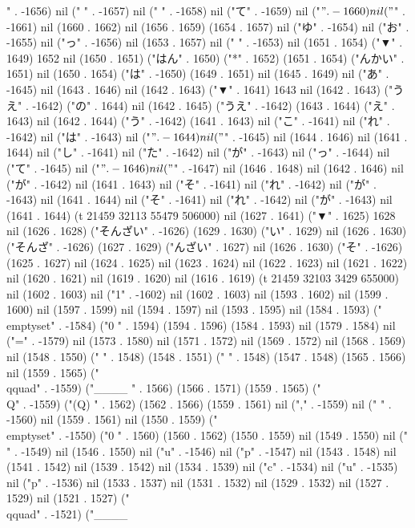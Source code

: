{" . -1656) nil (" " . -1657) nil (" " . -1658) nil ("て" . -1659) nil ("$" . -1660) nil ("$" . -1661) nil (1660 . 1662) nil (1656 . 1659) (1654 . 1657) nil ("ゆ" . -1654) nil ("お" . -1655) nil ("っ" . -1656) nil (1653 . 1657) nil (" " . -1653) nil (1651 . 1654) ("▼" . 1649) 1652 nil (1650 . 1651) ("はん" . 1650) ("*" . 1652) (1651 . 1654) ("んかい" . 1651) nil (1650 . 1654) ("は" . -1650) (1649 . 1651) nil (1645 . 1649) nil ("あ" . -1645) nil (1643 . 1646) nil (1642 . 1643) ("▼" . 1641) 1643 nil (1642 . 1643) ("うえ" . -1642) ("の" . 1644) nil (1642 . 1645) ("うえ" . -1642) (1643 . 1644) ("え" . 1643) nil (1642 . 1644) ("う" . -1642) (1641 . 1643) nil ("こ" . -1641) nil ("れ" . -1642) nil ("は" . -1643) nil ("$" . -1644) nil ("$" . -1645) nil (1644 . 1646) nil (1641 . 1644) nil ("し" . -1641) nil ("た" . -1642) nil ("が" . -1643) nil ("っ" . -1644) nil ("て" . -1645) nil ("$" . -1646) nil ("$" . -1647) nil (1646 . 1648) nil (1642 . 1646) nil ("が" . -1642) nil (1641 . 1643) nil ("そ" . -1641) nil ("れ" . -1642) nil ("が" . -1643) nil (1641 . 1644) nil ("そ" . -1641) nil ("れ" . -1642) nil ("が" . -1643) nil (1641 . 1644) (t 21459 32113 55479 506000) nil (1627 . 1641) ("▼" . 1625) 1628 nil (1626 . 1628) ("そんざい" . -1626) (1629 . 1630) ("い" . 1629) nil (1626 . 1630) ("そんざ" . -1626) (1627 . 1629) ("んざい" . 1627) nil (1626 . 1630) ("そ" . -1626) (1625 . 1627) nil (1624 . 1625) nil (1623 . 1624) nil (1622 . 1623) nil (1621 . 1622) nil (1620 . 1621) nil (1619 . 1620) nil (1616 . 1619) (t 21459 32103 3429 655000) nil (1602 . 1603) nil ("1" . -1602) nil (1602 . 1603) nil (1593 . 1602) nil (1599 . 1600) nil (1597 . 1599) nil (1594 . 1597) nil (1593 . 1595) nil (1584 . 1593) ("\\emptyset" . -1584) ("0
" . 1594) (1594 . 1596) (1584 . 1593) nil (1579 . 1584) nil ("=" . -1579) nil (1573 . 1580) nil (1571 . 1572) nil (1569 . 1572) nil (1568 . 1569) nil (1548 . 1550) ("   " . 1548) (1548 . 1551) (" " . 1548) (1547 . 1548) (1565 . 1566) nil (1559 . 1565) ("\\qquad" . -1559) ("____
" . 1566) (1566 . 1571) (1559 . 1565) ("\\Q" . -1559) ("(Q)
" . 1562) (1562 . 1566) (1559 . 1561) nil ("," . -1559) nil (" " . -1560) nil (1559 . 1561) nil (1550 . 1559) ("\\emptyset" . -1550) ("0
" . 1560) (1560 . 1562) (1550 . 1559) nil (1549 . 1550) nil ("\\" . -1549) nil (1546 . 1550) nil ("u" . -1546) nil ("p" . -1547) nil (1543 . 1548) nil (1541 . 1542) nil (1539 . 1542) nil (1534 . 1539) nil ("c" . -1534) nil ("u" . -1535) nil ("p" . -1536) nil (1533 . 1537) nil (1531 . 1532) nil (1529 . 1532) nil (1527 . 1529) nil (1521 . 1527) ("\\qquad" . -1521) ("____
}

